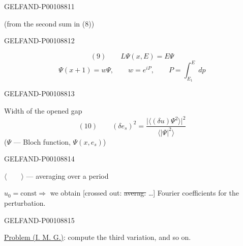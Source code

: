 \begin{GelfandAdjacentEvidence}{GELFAND-P001088}{11}

(from the second sum in (8))
\end{GelfandAdjacentEvidence}
\begin{GelfandAdjacentEvidence}{GELFAND-P001088}{12}


\[
(9)\qquad L\Psi(x,E)=E\Psi
\]
\[
\Psi(x+1)=w\Psi,\qquad w=e^{iP},\qquad P=\int_{E_1}^{E}dp
\]
\end{GelfandAdjacentEvidence}
\begin{GelfandAdjacentEvidence}{GELFAND-P001088}{13}


Width of the opened gap
\[
(10)\qquad
(\delta e_s)^2=
\frac{\bigl|\langle(\delta u)\Psi^2\rangle\bigr|^2}{\langle|\Psi|^2\rangle}
\]
($\Psi$ — Bloch function, $\Psi(x,e_s)$)
\end{GelfandAdjacentEvidence}
\begin{GelfandAdjacentEvidence}{GELFAND-P001088}{14}


$\langle\qquad\rangle$ — averaging over a period

$u_0=\mathrm{const}\Rightarrow$ we obtain [crossed out: \sout{averag.} …] Fourier coefficients for the perturbation.
\end{GelfandAdjacentEvidence}
\begin{GelfandAdjacentEvidence}{GELFAND-P001088}{15}


\uline{Problem (I. M. G.)}: compute the third variation, and so on.
\end{GelfandAdjacentEvidence}



